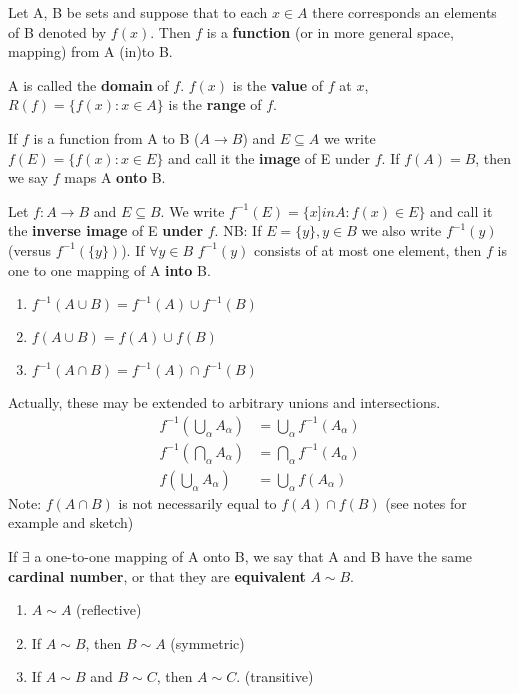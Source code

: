 \documentclass[11pt,fleqn]{book} %
\begin{document}
\begin{definition}
	Let A, B be sets and suppose that to each $x \in A$ there corresponds an elements of B denoted by $f(x)$. Then $f$ is a \textbf{function} (or in more general space, mapping) from A (in)to B. 

	A is called the \textbf{domain} of $f$. $f(x)$ is the \textbf{value} of $f$ at $x$, $R(f) = \{f(x): x \in A\}$ is the \textbf{range} of $f$.
\end{definition}

\begin{definition}[Image]
	If $f$ is a function from A to B ($A \rightarrow B$) and $E \subseteq A$ we write $f(E) = \{f(x): x \in E\}$ and call it the \textbf{image} of E under $f$.
	If $f(A) = B$, then we say $f$ maps A \textbf{onto} B.
\end{definition}

\begin{definition}
	Let $f: A \rightarrow B$ and $E \subseteq B$. We write $f^{-1}(E) = \{x ]in A : f(x) \in E\}$ and call it the \textbf{inverse image} of E \textbf{under} $f$.
	NB: If $E =\{y\}, y \in B$ we also write $f^{-1}(y)$ (versus $f^{-1}(\{y\})$). If $\forall y \in B$ $f^{-1}(y)$ consists of at most one element, then $f$ is one to one mapping of A \textbf{into} B.
\end{definition}

\begin{theorem}  
	\begin{enumerate}[label = \alph*)]
		\item $f^{-1}(A\cup B) = f^{-1}(A)\cup f^{-1}(B)$
		\item $f(A\cup B) = f(A) \cup f(B)$
		\item $f^{-1}(A\cap B) = f^{-1}(A) \cap f^{-1}(B)$
	\end{enumerate}
	Actually, these may be extended to arbitrary unions and intersections.
	\begin{align*}	
		f^{-1}(\bigcup\limits_\alpha A_\alpha) &= \bigcup_\alpha f^{-1}(A_\alpha)\\
		f^{-1} (\bigcap_\alpha A_\alpha) &= \bigcap_\alpha f^{-1}(A_\alpha)\\
		f(\bigcup_\alpha A_\alpha) &= \bigcup_\alpha f(A_\alpha)
	\end{align*}	
	Note: $f(A\cap B)$ is not necessarily equal to $f(A) \cap f(B)$ (see notes for example and sketch)
\end{theorem}

\begin{definition}
	If $\exists$ a one-to-one mapping of A onto B, we say that A and B have the same \textbf{cardinal number}, or that they are \textbf{equivalent} $A\sim B$.  
	\begin{enumerate}[label = \alph*)]
		\item $A \sim A$ (reflective)
		\item If $A \sim B$, then $B \sim A$ (symmetric)
		\item If $A \sim B$ and $B \sim C$, then $A \sim C$. (transitive)
	\end{enumerate}
\end{definition}
\end{document}
